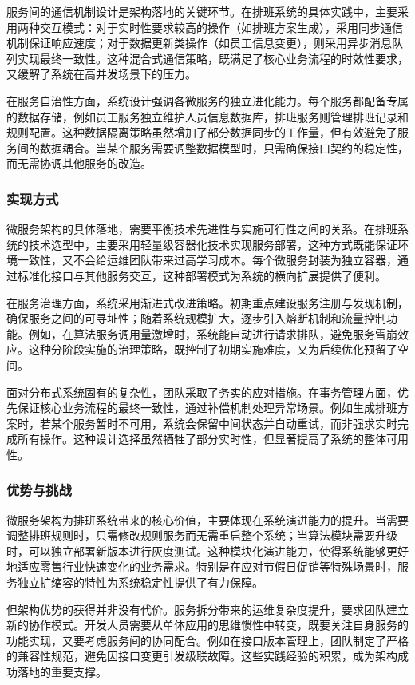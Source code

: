\documentclass{ctexart}
\begin{document}
服务间的通信机制设计是架构落地的关键环节。在排班系统的具体实践中，主要采用两种交互模式：对于实时性要求较高的操作（如排班方案生成），采用同步通信机制保证响应速度；对于数据更新类操作（如员工信息变更），则采用异步消息队列实现最终一致性。这种混合式通信策略，既满足了核心业务流程的时效性要求，又缓解了系统在高并发场景下的压力。

在服务自治性方面，系统设计强调各微服务的独立进化能力。每个服务都配备专属的数据存储，例如员工服务独立维护人员信息数据库，排班服务则管理排班记录和规则配置。这种数据隔离策略虽然增加了部分数据同步的工作量，但有效避免了服务间的数据耦合。当某个服务需要调整数据模型时，只需确保接口契约的稳定性，而无需协调其他服务的改造。

\subsubsection{实现方式}
微服务架构的具体落地，需要平衡技术先进性与实施可行性之间的关系。在排班系统的技术选型中，主要采用轻量级容器化技术实现服务部署，这种方式既能保证环境一致性，又不会给运维团队带来过高学习成本。每个微服务封装为独立容器，通过标准化接口与其他服务交互，这种部署模式为系统的横向扩展提供了便利。

在服务治理方面，系统采用渐进式改进策略。初期重点建设服务注册与发现机制，确保服务之间的可寻址性；随着系统规模扩大，逐步引入熔断机制和流量控制功能。例如，在算法服务调用量激增时，系统能自动进行请求排队，避免服务雪崩效应。这种分阶段实施的治理策略，既控制了初期实施难度，又为后续优化预留了空间。

面对分布式系统固有的复杂性，团队采取了务实的应对措施。在事务管理方面，优先保证核心业务流程的最终一致性，通过补偿机制处理异常场景。例如生成排班方案时，若某个服务暂时不可用，系统会保留中间状态并自动重试，而非强求实时完成所有操作。这种设计选择虽然牺牲了部分实时性，但显著提高了系统的整体可用性。

\subsubsection{优势与挑战}
微服务架构为排班系统带来的核心价值，主要体现在系统演进能力的提升。当需要调整排班规则时，只需修改规则服务而无需重启整个系统；当算法模块需要升级时，可以独立部署新版本进行灰度测试。这种模块化演进能力，使得系统能够更好地适应零售行业快速变化的业务需求。特别是在应对节假日促销等特殊场景时，服务独立扩缩容的特性为系统稳定性提供了有力保障。

但架构优势的获得并非没有代价。服务拆分带来的运维复杂度提升，要求团队建立新的协作模式。开发人员需要从单体应用的思维惯性中转变，既要关注自身服务的功能实现，又要考虑服务间的协同配合。例如在接口版本管理上，团队制定了严格的兼容性规范，避免因接口变更引发级联故障。这些实践经验的积累，成为架构成功落地的重要支撑。
\end{document}
